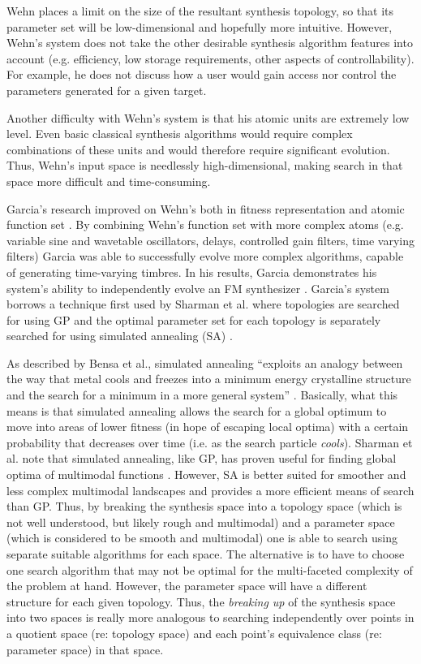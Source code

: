 \documentclass[a4paper,12pt]{report} 	%
\numberwithin{figure}{chapter}
\numberwithin{table}{chapter}
\numberwithin{equation}{chapter}
\begin{document}
\begin{flushleft}
Wehn places a limit on the size of the resultant synthesis topology, so that its parameter set will be low-dimensional and hopefully more intuitive. However, Wehn's system does not take the other desirable synthesis algorithm features into account (e.g. efficiency, low storage requirements, other aspects of controllability). For example, he does not discuss how a user would gain access nor control the parameters generated for a given target.

Another difficulty with Wehn's system is that his atomic units are extremely low level. Even basic classical synthesis algorithms would require complex combinations of these units and would therefore require significant evolution. Thus, Wehn's input space is needlessly high-dimensional, making search in that space more difficult and time-consuming.

Garcia's research improved on Wehn's both in fitness representation and atomic function set \cite{Garcia:2002cq}. By combining Wehn's function set with more complex atoms (e.g. variable sine and wavetable oscillators, delays, controlled gain filters, time varying filters) Garcia was able to successfully evolve more complex algorithms, capable of generating time-varying timbres. In his results, Garcia demonstrates his system's ability to independently evolve an FM synthesizer  \cite[p. 6]{Garcia:2002cq}. Garcia's system borrows a technique first used by Sharman et al. where topologies are searched for using GP and the optimal parameter set for each topology is separately searched for using simulated annealing (SA) \cite{Sharman:1995bs}. 

As described by Bensa et al., simulated annealing ``exploits an analogy between the way that metal cools and freezes into a minimum energy crystalline structure and the search for a minimum in a more general system'' \cite[p. 501]{Bensa:2005xq}. Basically, what this means is that simulated annealing allows the search for a global optimum to move into areas of lower fitness (in hope of escaping local optima) with a certain probability that decreases over time (i.e. as the search particle \emph{cools}). Sharman et al. note that simulated annealing, like GP, has proven useful for finding global optima of multimodal functions \cite[p. 1]{Sharman:1995bs}. However, SA is better suited for smoother and less complex multimodal landscapes and provides a more efficient means of search than GP. Thus, by breaking the synthesis space into a topology space (which is not well understood, but likely rough and multimodal) and a parameter space (which is considered to be smooth and multimodal) one is able to search using separate suitable algorithms for each space. The alternative is to have to choose one search algorithm that may not be optimal for the multi-faceted complexity of the problem at hand. However, the parameter space will have a different structure for each given topology. Thus, the \emph{breaking up} of the synthesis space into two spaces is really more analogous to searching independently over points in a quotient space (re: topology space) and each point's equivalence class (re: parameter space) in that space.


\end{flushleft}
\end{document}
